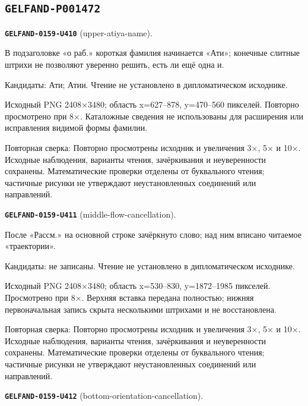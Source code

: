 \subsection*{\texttt{GELFAND-P001472}}
\par\noindent\leavevmode{}\label{GELFAND-0159-U410}\label{GELFAND-P001472:upper-atiya-name}\textbf{\texttt{GELFAND-0159-U410}} (upper-atiya-name).\nopagebreak[4]\par
В подзаголовке «о раб.» короткая фамилия начинается «Ати»; конечные слитные штрихи не позволяют уверенно решить, есть ли ещё одна и.\par
Кандидаты: Ати; Атии. Чтение не установлено в дипломатическом исходнике.\par
Исходный PNG 2408×3480; область x=627–878, y=470–560 пикселей. Повторно просмотрено при 8×. Каталожные сведения не использованы для расширения или исправления видимой формы фамилии.\par
Повторная сверка: Повторно просмотрены исходник и увеличения 3×, 5× и 10×. Исходные наблюдения, варианты чтения, зачёркивания и неуверенности сохранены. Математические проверки отделены от буквального чтения; частичные рисунки не утверждают неустановленных соединений или направлений.\par\medskip
\par\noindent\leavevmode{}\label{GELFAND-0159-U411}\label{GELFAND-P001472:middle-flow-cancellation}\textbf{\texttt{GELFAND-0159-U411}} (middle-flow-cancellation).\nopagebreak[4]\par
После «Рассм.» на основной строке зачёркнуто слово; над ним вписано читаемое «траектории».\par
Кандидаты: не записаны. Чтение не установлено в дипломатическом исходнике.\par
Исходный PNG 2408×3480; область x=530–830, y=1872–1985 пикселей. Просмотрено при 8×. Верхняя вставка передана полностью; нижняя первоначальная запись скрыта несколькими штрихами и не восстановлена.\par
Повторная сверка: Повторно просмотрены исходник и увеличения 3×, 5× и 10×. Исходные наблюдения, варианты чтения, зачёркивания и неуверенности сохранены. Математические проверки отделены от буквального чтения; частичные рисунки не утверждают неустановленных соединений или направлений.\par\medskip
\par\noindent\leavevmode{}\label{GELFAND-0159-U412}\label{GELFAND-P001472:bottom-orientation-cancellation}\textbf{\texttt{GELFAND-0159-U412}} (bottom-orientation-cancellation).\nopagebreak[4]\par
